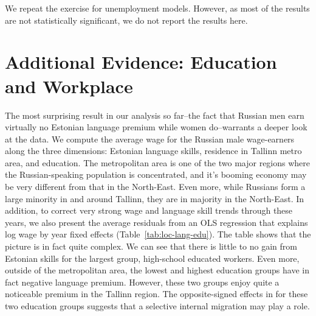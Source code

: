 \documentclass[12pt, a4paper]{article}
\begin{document}
We repeat the exercise for unemployment models.
However, as most of the results are not statistically significant, we
do not report the results here.



\section{Additional Evidence: Education and Workplace}
\label{sec:segregation_analysis}

The most surprising result in our analysis so far--the fact that
Russian men earn virtually no Estonian language premium while women do--warrants a
deeper look at the data.  We compute the average wage for the Russian male wage-earners
along the three
dimensions: Estonian language skills, residence in Tallinn metro area,
and education.  The metropolitan area is one of the two major regions
where the Russian-speaking population is concentrated, and it's
booming economy may be very different from that in the North-East.
Even more, while Russians form a large minority in and around Tallinn,
they are in majority in the North-East.  
In addition, to correct very strong wage and language skill trends through these
years, we also present the average
residuals from an OLS regression that explains log wage by year fixed
effects (Table~\ref{tab:loc-lang-edu}). 
The table shows that the picture is in fact quite complex.  We can see
that there is little to no gain from Estonian skills for the
largest group, high-school educated workers.  Even more, outside of
the metropolitan area, the lowest and highest education groups
have in fact negative language premium.  However, these two groups
enjoy quite a noticeable premium in the Tallinn region.  The
opposite-signed effects in for these two education groups suggests
that a
selective internal migration may play a role.
\end{document}
